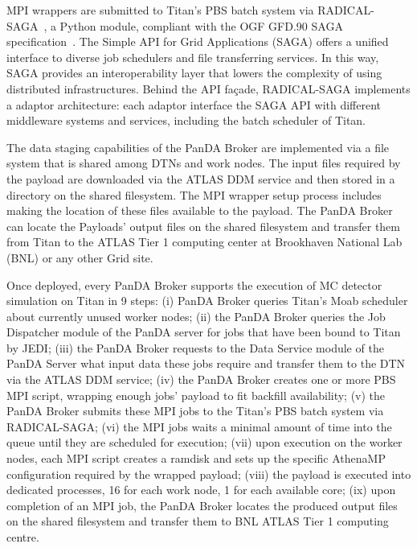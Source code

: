 MPI wrappers are submitted to Titan's PBS batch system via
RADICAL-SAGA~\cite{radical-saga}, a Python module, compliant with the OGF GFD.90
SAGA specification~\cite{saga-spec}. The Simple API for Grid Applications (SAGA)
offers a unified interface to diverse job schedulers and file transferring
services. In this way, SAGA provides an interoperability layer that lowers the
complexity of using distributed infrastructures. Behind the API façade,
RADICAL-SAGA implements a adaptor architecture: each adaptor interface the SAGA
API with different middleware systems and services, including the batch
scheduler of Titan.

The data staging capabilities of the PanDA Broker are implemented via a file
system that is shared among DTNs and work nodes. The input files required by the
payload are downloaded via the ATLAS DDM service and then stored in a directory
on the shared filesystem. The MPI wrapper setup process includes making the
location of these files available to the payload. The PanDA Broker can locate
the Payloads' output files on the shared filesystem and transfer them from Titan
to the ATLAS Tier 1 computing center at Brookhaven National Lab (BNL) or any
other Grid site.


Once deployed, every PanDA Broker supports the execution of MC detector
simulation on Titan in 9 steps: (i) PanDA Broker queries Titan's Moab scheduler
about currently unused worker nodes; (ii) the PanDA Broker queries the Job
Dispatcher module of the PanDA server for jobs that have been bound to Titan by
JEDI; (iii)  the PanDA Broker requests to the Data Service module of the PanDA
Server what input data these jobs require and transfer them to the DTN via the
ATLAS DDM service; (iv) the PanDA Broker creates one or more PBS MPI script,
wrapping enough jobs' payload to fit backfill availability; (v) the PanDA Broker
submits these MPI jobs to the Titan's PBS batch system via RADICAL-SAGA; (vi)
the MPI jobs waits a minimal amount of time into the queue until they are
scheduled for execution; (vii) upon execution on the worker nodes, each MPI
script creates a ramdisk and sets up the specific AthenaMP configuration
required by the wrapped payload; (viii) the payload is executed into dedicated
processes, 16 for each work node, 1 for each available core; (ix) upon
completion of an MPI job, the PanDA Broker locates the produced output files on
the shared filesystem and transfer them to BNL ATLAS Tier 1 computing centre.


